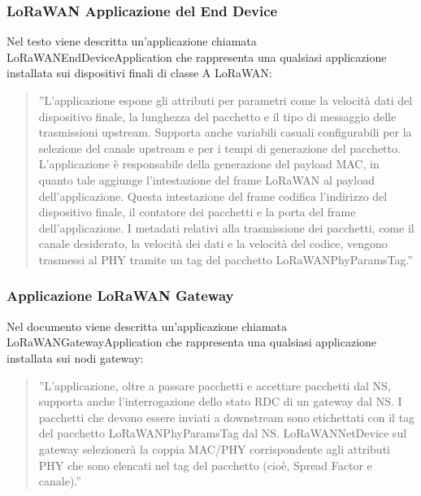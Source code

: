 \documentclass[a4paper]{report} %
\begin{document}
\subsubsection{LoRaWAN Applicazione del End Device}
Nel testo \cite{art:rif.49} viene descritta un'applicazione chiamata LoRaWANEndDeviceApplication che rappresenta una qualsiasi applicazione installata sui dispositivi finali di classe A LoRaWAN: 
\begin{quote}
	''L'applicazione espone gli attributi per parametri come la velocità dati del dispositivo finale, la lunghezza del pacchetto e il tipo di messaggio delle trasmissioni upstream. Supporta anche variabili casuali configurabili per la selezione del canale upstream e per i tempi di generazione del pacchetto. L'applicazione è responsabile della generazione del payload MAC, in quanto tale aggiunge l'intestazione del frame LoRaWAN al payload dell'applicazione. Questa intestazione del frame codifica l'indirizzo del dispositivo finale, il contatore dei pacchetti e la porta del frame dell'applicazione. I metadati relativi alla trasmissione dei pacchetti, come il canale desiderato, la velocità dei dati e la velocità del codice, vengono trasmessi al PHY tramite un tag del pacchetto LoRaWANPhyParamsTag.''
\end{quote}

\subsubsection{Applicazione LoRaWAN Gateway}
Nel documento \cite{art:rif.49} viene descritta un'applicazione chiamata LoRaWANGatewayApplication che rappresenta una qualsiasi applicazione installata sui nodi gateway:
\begin{quote}
	''L'applicazione, oltre a passare pacchetti e accettare pacchetti dal NS, supporta anche l'interrogazione dello stato RDC di un gateway dal NS. I pacchetti che devono essere inviati a downstream sono etichettati con il tag del pacchetto LoRaWANPhyParamsTag dal NS. LoRaWANNetDevice sul gateway selezionerà la coppia MAC/PHY corrispondente agli attributi PHY che sono elencati nel tag del pacchetto (cioè, Spread Factor e canale).''
\end{quote}
\end{document}
